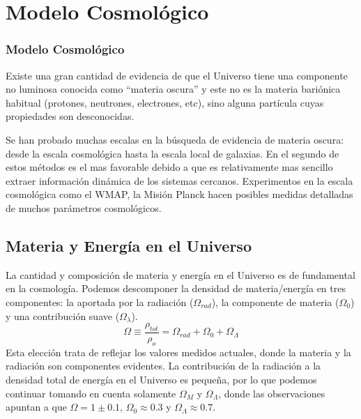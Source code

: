 \documentclass{beamer}
\begin{document}
\section{Modelo Cosmológico}
	\begin{frame}
		\frametitle{Modelo Cosmológico}
		Existe una gran cantidad de evidencia de que el Universo tiene una componente no luminosa conocida como ``materia oscura'' y este no es la materia bariónica habitual (protones, neutrones, electrones, etc), sino alguna partícula cuyas propiedades son desconocidas.

Se han probado muchas escalas en la búsqueda de evidencia de materia oscura: desde la escala cosmológica hasta la escala local de galaxias. En el segundo de estos métodos es el mas favorable debido a que es relativamente mas sencillo extraer información dinámica de los sistemas cercanos. Experimentos en la escala cosmológica como el WMAP, la Misión Planck hacen posibles medidas detalladas de muchos parámetros cosmológicos.

	\end{frame}

\subsection{Materia y Energía en el Universo}
	\begin{frame}
		La cantidad y composición de materia y energía en el Universo es de fundamental en la cosmología. Podemos descomponer la densidad de materia/energía en tres componentes: la aportada por la radiación ($\Omega_{rad}$), la componente de materia ($\Omega_{0}$) y una contribución suave ($\Omega_{\lambda}$).		
		\begin{equation}
			\Omega \equiv \frac{\rho_{tot}}{\rho_o} = \Omega_{rad} + \Omega_0 + \Omega_{\Lambda}
		\end{equation}
Esta elección trata de reflejar los valores medidos actuales, donde la materia y la radiación son componentes evidentes. La contribución de la radiación a la densidad total de energía en el Universo es pequeña, por lo que podemos continuar tomando en cuenta solamente $\Omega_{M}$ y $\Omega_{\Lambda}$, donde las observaciones apuntan a que $\Omega=1\pm 0.1$, $\Omega_{0}\approx 0.3$ y $\Omega_{\Lambda}\approx 0.7$.
	\end{frame}
	
\end{document}
